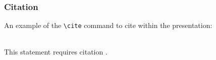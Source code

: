 \begin{frame}[fragile] %
\frametitle{Citation}
An example of the \verb|\cite| command to cite within the presentation:\\~

This statement requires citation \cite{p1}.
\end{frame}




%     
%









